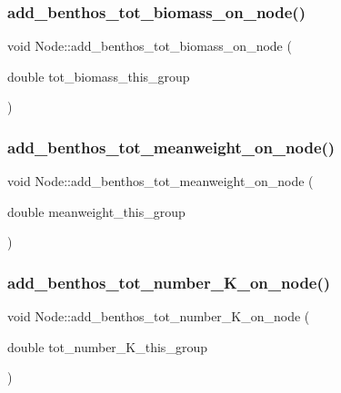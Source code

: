 \subsubsection{\texorpdfstring{add\_benthos\_tot\_biomass\_on\_node()}{add\_benthos\_tot\_biomass\_on\_node()}}
{\footnotesize\ttfamily void Node\+::add\+\_\+benthos\+\_\+tot\+\_\+biomass\+\_\+on\+\_\+node (\begin{DoxyParamCaption}\item[{double}]{tot\+\_\+biomass\+\_\+this\+\_\+group }\end{DoxyParamCaption})}

\mbox{\label{class_node_a3abc9e346868f6d2e92ad7fc66c35661}} 
\subsubsection{\texorpdfstring{add\_benthos\_tot\_meanweight\_on\_node()}{add\_benthos\_tot\_meanweight\_on\_node()}}
{\footnotesize\ttfamily void Node\+::add\+\_\+benthos\+\_\+tot\+\_\+meanweight\+\_\+on\+\_\+node (\begin{DoxyParamCaption}\item[{double}]{meanweight\+\_\+this\+\_\+group }\end{DoxyParamCaption})}

\mbox{\label{class_node_a5f6087632a0fad4b54979b03600dfb80}} 
\subsubsection{\texorpdfstring{add\_benthos\_tot\_number\_K\_on\_node()}{add\_benthos\_tot\_number\_K\_on\_node()}}
{\footnotesize\ttfamily void Node\+::add\+\_\+benthos\+\_\+tot\+\_\+number\+\_\+\+K\+\_\+on\+\_\+node (\begin{DoxyParamCaption}\item[{double}]{tot\+\_\+number\+\_\+\+K\+\_\+this\+\_\+group }\end{DoxyParamCaption})}

\mbox{\label{class_node_ae622072140d53b330aec6c23f9a611d3}} 
